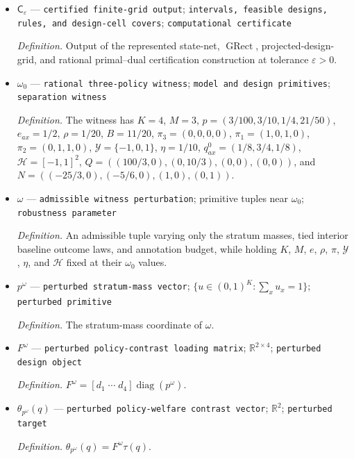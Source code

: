 \documentclass{article}
\begin{document}
\begin{itemize}
  \item \(\mathsf C_\varepsilon\) --- \texttt{certified finite-\allowbreak{}grid output}; \texttt{intervals,\allowbreak{} feasible designs,\allowbreak{} rules,\allowbreak{} and design-\allowbreak{}cell covers}; \texttt{computational certificate}
  \par\smallskip\noindent\emph{Definition.} Output of the represented state-net, \(\operatorname{GRect}\), projected-design-grid, and rational primal--dual certification construction at tolerance \(\varepsilon>0\).
  \item \(\omega_0\) --- \texttt{rational three-\allowbreak{}policy witness}; \texttt{model and design primitives}; \texttt{separation witness}
  \par\smallskip\noindent\emph{Definition.} The witness has \(K=4\), \(M=3\), \(p=(3/100,3/10,1/4,21/50)\), \(e_{ax}=1/2\), \(\rho=1/20\), \(B=11/20\), \(\pi_3=(0,0,0,0)\), \(\pi_1=(1,0,1,0)\), \(\pi_2=(0,1,1,0)\), \(\mathcal Y=\{-1,0,1\}\), \(\eta=1/10\), \(q^0_{ax}=(1/8,3/4,1/8)\), \(\mathcal H=[-1,1]^2\), \(Q=((100/3,0),(0,10/3),(0,0),(0,0))\), and \(N=((-25/3,0),(-5/6,0),(1,0),(0,1))\).
  \item \(\omega\) --- \texttt{admissible witness perturbation}; primitive tuples near \(\omega_0\); \texttt{robustness parameter}
  \par\smallskip\noindent\emph{Definition.} An admissible tuple varying only the stratum masses, tied interior baseline outcome laws, and annotation budget, while holding \(K\), \(M\), \(e\), \(\rho\), \(\pi\), \(\mathcal Y\), \(\eta\), and \(\mathcal H\) fixed at their \(\omega_0\) values.
  \item \(p^\omega\) --- \texttt{perturbed stratum-\allowbreak{}mass vector}; \(\{u\in(0,1)^K:\sum_xu_x=1\}\); \texttt{perturbed primitive}
  \par\smallskip\noindent\emph{Definition.} The stratum-mass coordinate of \(\omega\).
  \item \(F^\omega\) --- \texttt{perturbed policy-\allowbreak{}contrast loading matrix}; \(\mathbb R^{2\times4}\); \texttt{perturbed design object}
  \par\smallskip\noindent\emph{Definition.} \(F^\omega=[d_1\;\cdots\;d_4]\operatorname{diag}(p^\omega)\).
  \item \(\theta_{p^\omega}(q)\) --- \texttt{perturbed policy-\allowbreak{}welfare contrast vector}; \(\mathbb R^2\); \texttt{perturbed target}
  \par\smallskip\noindent\emph{Definition.} \(\theta_{p^\omega}(q)=F^\omega\tau(q)\).

\end{itemize}
\end{document}
